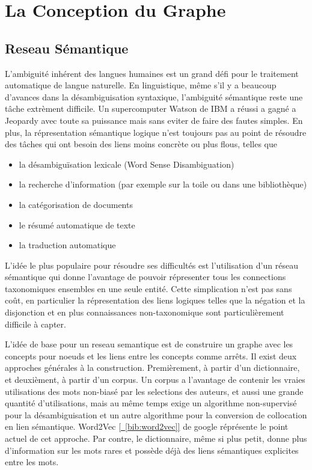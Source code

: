 \section{La Conception du Graphe}

\subsection{Reseau Sémantique}

L'ambiguité inhérent des langues humaines est un grand défi pour le traitement automatique
de langue naturelle. En linguistique, même s'il y a beaucoup d'avances dans la
désambiguisation syntaxique, l'ambiguité sémantique reste une tâche extrèment difficile.
Un supercomputer Watson de IBM a réussi a gagné a Jeopardy avec toute sa
puissance mais sans eviter de faire des fautes simples. En plus, la répresentation
sémantique logique n'est toujours pas au point de résoudre des tâches qui ont
besoin des liens moins concrète ou plus flous, telles que
\begin{itemize}
\item la désambiguïsation lexicale (Word Sense Disambiguation)
\item la recherche d'information (par exemple sur la toile ou dans une bibliothèque)
\item la catégorisation de documents
\item le résumé automatique de texte
\item la traduction automatique
\end{itemize}
L'idée le plus populaire pour résoudre ses difficultés est l'utilisation d'un réseau
sémantique qui donne l'avantage de pouvoir répresenter tous les connections taxonomiques
ensembles en une seule entité. Cette simplication n'est pas sans coût, en particulier
la répresentation des liens logiques telles que la négation et la disjonction 
et en plus connaissances non-taxonomique sont particulièrement difficile à capter.

L'idée de base pour un reseau semantique est de construire un graphe avec
les concepts pour noeuds et les liens entre les concepts comme arrêts.
Il exist deux approches générales à la construction. Premièrement, à
partir d'un dictionnaire, et deuxièment, à partir d'un corpus.
Un corpus a l'avantage de contenir les vraies utilisations des mots non-biasé
par les selections des auteurs, et aussi une grande
quantité d'utilisations, mais au même temps exige un algorithme non-supervisé pour la
désambiguisation et un autre algorithme pour la conversion de collocation en lien sémantique.
Word2Vec \hyperref[bib:word2vec]{[~\ref*{bib:word2vec}]} de
google réprésente le point actuel de cet approche.
Par contre, le dictionnaire, même si plus petit, donne plus
d'information sur les mots rares et possède déjà des liens sémantiques explicites entre
les mots.

